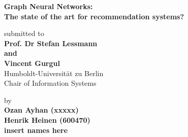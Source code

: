 
    \begin{center}
        
    
    {\Large{\bf Graph Neural Networks: \\
    The state of the art for recommendation systems?
    }} \vspace{2cm}


    {\normalsize submitted to}\\\vspace{0.5cm}
    {\normalsize{\bf Prof. Dr Stefan Lessmann}}\\
    {\normalsize{\bf and}}\\
    {\normalsize{\bf Vincent Gurgul }}
    \\\vspace{0.5cm}
    {\normalsize Humboldt-Universit\"at zu Berlin \\
    Chair of Information Systems}


    {\normalsize by \\\vspace{0.5cm}
    {\bf Ozan Ayhan (xxxxx)} \\
    {\bf Henrik Heinen (600470)} \\
    {\bf insert names here} \\
    } \vspace{1cm}

    \end{center}




